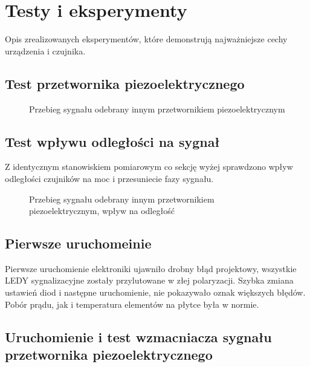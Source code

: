 \chapter[Testy i eksperymenty]{Testy i eksperymenty}

\label{testy}

Opis zrealizowanych eksperymentów, które demonstrują
najważniejsze cechy urządzenia i czujnika.

\section{Test przetwornika piezoelektrycznego}

\begin{figure}[!ht]
    \centering
    \caption{Przebieg sygnału odebrany innym przetwornikiem piezoelektrycznym}
    \label{fig:oscylo_piezo}
\end{figure}

\section{Test wpływu odległości na sygnał}
Z identycznym stanowiskiem pomiarowym co sekcję wyżej sprawdzono wpływ odległości czujników na moc i przesuniecie fazy sygnału. 

\begin{figure}[!ht]
    \centering
    \caption{Przebieg sygnału odebrany innym przetwornikiem piezoelektrycznym, wpływ na odległość}
    \label{fig:oscylo_2piezo}
\end{figure}

\section{Pierwsze uruchomeinie}
Pierwsze uruchomienie elektroniki ujawniło drobny błąd projektowy, wszystkie LEDY sygnalizacyjne zostały przylutowane w złej polaryzacji.
Szybka zmiana ustawień diod i następne uruchomienie, nie pokazywało oznak większych błędów. Pobór prądu, jak i temperatura elementów na 
płytce była w normie.

\section{Uruchomienie i test wzmacniacza sygnału przetwornika piezoelektrycznego}

